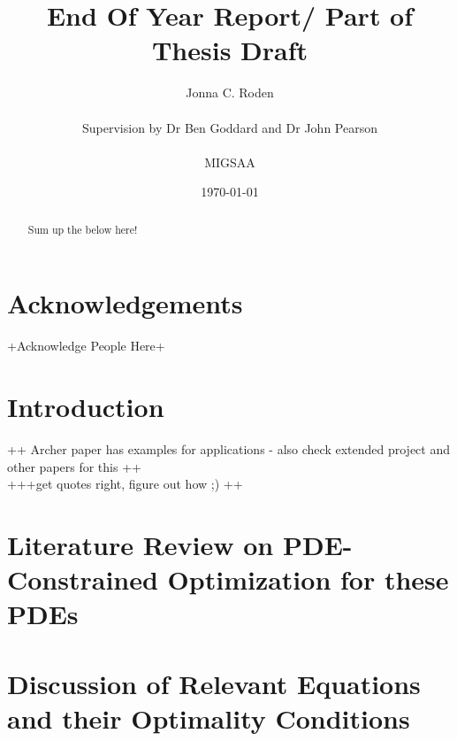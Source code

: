 \documentclass[11pt, a4paper]{article}
\title{End Of Year Report/ Part of Thesis Draft}
\author{Jonna C. Roden\\ \\Supervision by Dr Ben Goddard and Dr John Pearson\\ \\ \vspace{0.5cm} MIGSAA}
\date{\today}
\theoremstyle{definition}
\begin{document}
	
	\maketitle
	\begin{abstract}
		Sum up the below here!
		
	\end{abstract}
	
	\newpage
	\section*{Acknowledgements}
	+Acknowledge People Here+
	\newpage
	\tableofcontents
	\newpage
















\section{Introduction}
++ Archer paper has examples for applications - also check extended project and other papers for this ++\\
+++get quotes right, figure out how ;) ++

\section{Literature Review on PDE-Constrained Optimization for these PDEs}

\section{Discussion of Relevant Equations and their Optimality Conditions}
\end{document}
